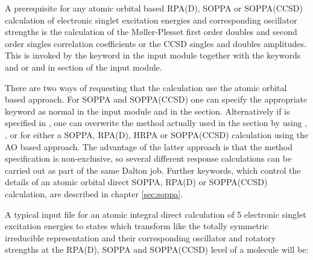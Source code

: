 A prerequisite for any atomic orbital based RPA(D), SOPPA or
SOPPA(CCSD) calculation of electronic singlet excitation energies and
corresponding oscillator strengths is the calculation of the
M{\o}ller-Plesset first order doubles and second order singles
correlation coefficients or the CCSD singles and doubles amplitudes.
This is invoked by the keyword  in the 
input module together with the keywords  and  or
 and  in  section of the
 input module. 

There are two ways of requesting that the calculation use the atomic 
orbital based approach. 
For SOPPA and SOPPA(CCSD) one can specify the 
appropriate keyword as normal in the  input module
and  in the  section. 
Alternatively if  is specified in , one 
can overwrite the method actually used in the  section by using
, ,   or  for either a 
SOPPA, RPA(D), HRPA or SOPPA(CCSD) calculation using the AO based approach.
The advantage of the latter approach is that the method specification is 
non-exclusive, so several different response calculations can be 
carried out as part of the same Dalton job. 
Further keywords, which control the details of an atomic
orbital direct SOPPA, RPA(D) or SOPPA(CCSD) calculation, are described
in chapter \ref{sec:soppa}.

A typical input file for an atomic integral direct calculation of 5
electronic singlet excitation energies to states which transform like
the totally symmetric irreducible representation and their
corresponding oscillator and rotatory strengths at the RPA(D), SOPPA and SOPPA(CCSD)
level of a molecule will be:

